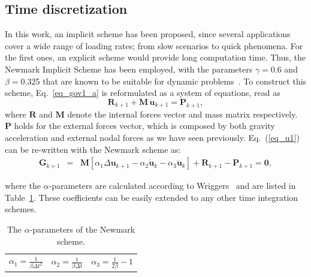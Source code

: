 \documentclass[applsci,journal,article,submit,moreauthors,pdftex]{Definitions/mdpi}
\begin{document}
  \subsection{Time discretization}
  In this work, an implicit scheme has been proposed, since several applications cover a wide range of loading rates; from slow scenarios to quick phenomena. For the first ones, an explicit scheme would provide long computation time. Thus, the Newmark Implicit Scheme has been employed, with the parameters $\gamma=$0.6 and $\beta=$0.325 that are known to be suitable for dynamic problems~\cite{Kontoe2006}. To construct this scheme, Eq.~\eqref{eq_gov1_a} is reformulated as a system of equations, read as
\begin{equation}\label{eq_u1}
 \boldsymbol{ R}_{k+1}  +   \boldsymbol{M}   \, \boldsymbol {\ddot{u}}_{k+1}= \boldsymbol{P }_{k+1},
\end{equation}
where   $\boldsymbol{R}$ and $  \boldsymbol{ M}$  denote the internal forces vector and mass matrix respectively. $\boldsymbol{P}$ holds for the external forces vector, which is composed by both gravity acceleration and external nodal forces as we have seen previously. Eq.~(\ref{eq_u1}) can be re-written with the Newmark scheme as:
\begin{eqnarray}\label{eq_u2}
\boldsymbol {G}_{k+1} &=& \boldsymbol {M}\left[\alpha_1\Delta\boldsymbol {u}_{k+1}-\alpha_2\boldsymbol {\dot{u}}_{k}-\alpha_3\boldsymbol {\ddot{u}}_{k}\right] +
\boldsymbol {R}_{k+1}-\boldsymbol {P}_{k+1}=\boldsymbol {0},
\end{eqnarray}

\noindent where the $\alpha$-parameters are calculated according to Wriggers~\cite{wriggers:08} and are listed in Table~\ref{tab1}. These coefficients can be easily extended to any other time integration schemes. 
\begin{table}
\caption{\label{tab1} The $\alpha$-parameters of the Newmark scheme.} 
\centering
	\begin{tabular}{lll}
	 $\alpha_1=\frac{1}{\beta\Delta t^2}$ & 	 $\alpha_2=\frac{1}{\beta\Delta t}$ & 
	 $\alpha_3=\frac{1}{2\beta}-1$
	\end{tabular}
\end{table}
\end{document}
